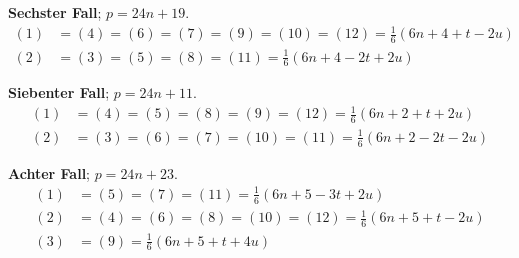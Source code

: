 \documentclass[12pt,a4paper]{article}
\begin{document}
\textbf{Sechster Fall}; $p = 24n+19$.
\begin{align*}
(1) &= (4) = (6) = (7) = (9) = (10) = (12) = \tfrac{1}{6}(6n+4+t-2u)\\
(2) &= (3) = (5) = (8) = (11) = \tfrac{1}{6}(6n+4-2t+2u)
\end{align*}

\textbf{Siebenter Fall}; $p = 24n+11$.
\begin{align*}
(1) &= (4) = (5) = (8) = (9) = (12) = \tfrac{1}{6}(6n+2+t+2u)\\
(2) &= (3) = (6) = (7) = (10) = (11) = \tfrac{1}{6}(6n+2-2t-2u)
\end{align*}

\textbf{Achter Fall}; $p = 24n+23$.
\begin{align*}
(1) &= (5) = (7) = (11) = \tfrac{1}{6}(6n+5-3t+2u)\\
(2) &= (4) = (6) = (8) = (10) = (12) = \tfrac{1}{6}(6n+5+t-2u)\\
(3) &= (9) = \tfrac{1}{6}(6n+5+t+4u)
\end{align*}
\end{document}
